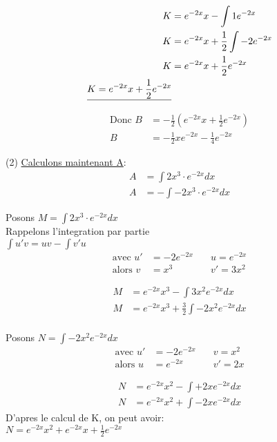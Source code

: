 \begin{align*}
	K &= e^{-2x}x - \int 1e^{-2x} \\
	K &= e^{-2x}x + \frac{1}{2} \int -2e^{-2x} \\
	K &= e^{-2x}x + \frac{1}{2} e^{-2x} \\
	\text{\underline{$K = e^{-2x}x + \frac{1}{2} e^{-2x}$}}
\end{align*}

\begin{align*}
	\text{Donc } B &= -\frac{1}{2}(e^{-2x}x + \frac{1}{2} e^{-2x}) \\
	B &= -\frac{1}{2} x e^{-2x} - \frac{1}{4} e^{-2x}
\end{align*}

\vspace{0.5cm}
(2) \underline{Calculons maintenant A}:
\begin{align*}
	A &= \int 2x^3 \cdot e^{-2x} dx \\
	A &= - \int - 2x^3 \cdot e^{-2x} dx
\end{align*}

Posons $M = \int 2x^3 \cdot e^{-2x} dx$ \\
Rappelons l'integration par partie \\
$\int u'v = uv - \int v'u$ \\
\begin{align*}
	\text{avec } u' &= -2e^{-2x} \quad &u= e^{-2x} \\
	\text{alors } v &= x^3 \quad &v'= 3x^2
\end{align*}

\begin{align*}
	M &= e^{-2x}x^3 - \int 3x^2e^{-2x} dx \\
	M &= e^{-2x}x^3 + \frac{3}{2}\int -2 x^2e^{-2x} dx \\
\end{align*}

Posons $N = \int -2 x^2e^{-2x} dx$ \\
\begin{align*}
	\text{avec } u' &= -2e^{-2x} \quad &v= x^{2} \\
	\text{alors } u &= e^{-2x} \quad &v'= 2x
\end{align*}

\begin{align*}
	N &= e^{-2x} x^2 - \int + 2xe^{-2x}dx \\
	N &= e^{-2x} x^2 + \int - 2xe^{-2x}dx
\end{align*}
D'apres le calcul de K, on peut avoir: \\
\underline{$N = e^{-2x}x^2 + e^{-2x}x + \frac{1}{2} e^{-2x}$} \\

